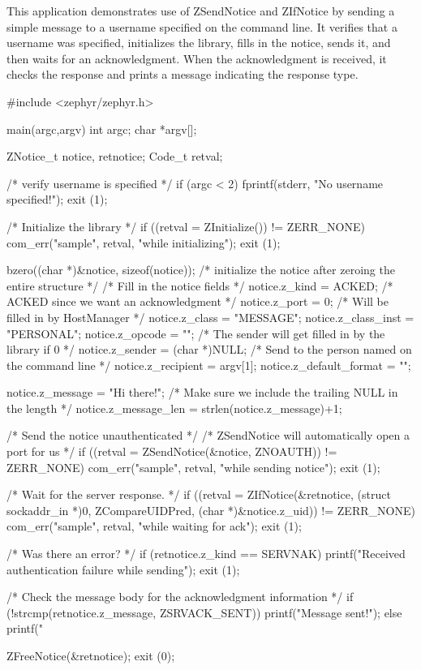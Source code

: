 This application demonstrates use of ZSendNotice and ZIfNotice by
sending a simple message to a username specified on the command line.  It
verifies that a username was specified, initializes the library, fills in
the notice, sends it, and then waits for an acknowledgment.  When the
acknowledgment is received, it checks the response and prints a message
indicating the response type.

\begin{code}
#include <zephyr/zephyr.h>

main(argc,argv)
    int argc;
    char *argv[];
{
    ZNotice_t notice, retnotice;
    Code_t retval;

    /* verify username is specified */
    if (argc < 2) {
        fprintf(stderr, "No username specified!\n");
        exit (1);
    }

    /* Initialize the library */
    if ((retval = ZInitialize()) != ZERR_NONE) {
        com_err("sample", retval, "while initializing");
        exit (1);
    }

    bzero((char *)&notice, sizeof(notice));
    /* initialize the notice after zeroing the entire structure */
    /* Fill in the notice fields */
    notice.z_kind = ACKED;      /* ACKED since we want an acknowledgment */
    notice.z_port = 0;  /* Will be filled in by HostManager */
    notice.z_class = "MESSAGE";
    notice.z_class_inst = "PERSONAL";
    notice.z_opcode = "";
    /* The sender will get filled in by the library if 0 */
    notice.z_sender = (char *)NULL;
    /* Send to the person named on the command line */
    notice.z_recipient = argv[1];
    notice.z_default_format = "";

    notice.z_message = "Hi there!\n";
    /* Make sure we include the trailing NULL in the length */
    notice.z_message_len = strlen(notice.z_message)+1;

    /* Send the notice unauthenticated */
    /* ZSendNotice will automatically open a port for us */
    if ((retval = ZSendNotice(&notice, ZNOAUTH)) != ZERR_NONE) {
        com_err("sample", retval, "while sending notice");
        exit (1);
    }

    /* Wait for the server response. */
    if ((retval = ZIfNotice(&retnotice, (struct sockaddr_in *)0,
                            ZCompareUIDPred,
                            (char *)&notice.z_uid)) != ZERR_NONE) {
            com_err("sample", retval, "while waiting for ack");
            exit (1);
    } 

    /* Was there an error? */
    if (retnotice.z_kind == SERVNAK) {
        printf("Received authentication failure while sending\n");
        exit (1);
    }

    /* Check the message body for the acknowledgment information */
    if (!strcmp(retnotice.z_message, ZSRVACK_SENT))
        printf("Message sent!\n");
    else
        printf("%

    ZFreeNotice(&retnotice);
    exit (0);
}
\end{code}
